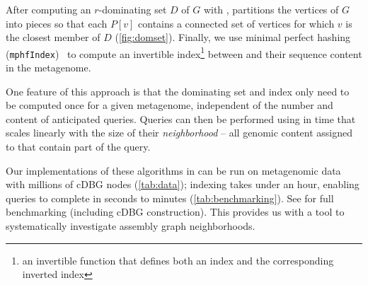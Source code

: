 

After computing an $r$-dominating set $D$ of $G$ with ,
 partitions the vertices of $G$ into pieces so that
each \piece $P[v]$ contains a connected set of vertices for which $v$ is the
closest member of $D$ (\autoref{fig:domset}). Finally, we use minimal perfect
hashing (\texttt{mphfIndex})~\cite{limasset2017mphf} to compute an invertible
index\footnote{an invertible function that defines both an index and the corresponding inverted index}
between \pieces and their sequence content in the metagenome.

One feature of this approach is that the dominating set and index only need to be computed once for a given metagenome, independent of the number and content of anticipated queries.
Queries
can then be performed using  in time that
scales linearly with the size of their {\em neighborhood} --
all genomic content assigned to \pieces that contain part of the query.

Our implementations of these algorithms in \sgc can be run on
metagenomic data with millions of cDBG nodes (\autoref{tab:data});
indexing takes under an hour, enabling queries to complete in seconds
to minutes (\autoref{tab:benchmarking}). See 
for full benchmarking (including cDBG construction). This
provides us with a tool to systematically investigate assembly graph
neighborhoods.




